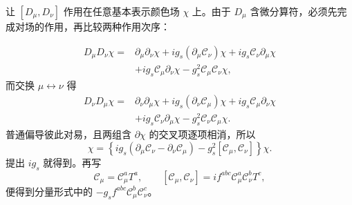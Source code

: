 \begin{derivation}
让 $[D_\mu,D_\nu]$ 作用在任意基本表示颜色场 $\chi$ 上。由于 $D_\mu$ 含微分算符，必须先完成对场的作用，再比较两种作用次序：

\begin{align*}
D_\mu D_\nu\chi
={}&\partial_\mu\partial_\nu\chi
+i g_s(\partial_\mu\mathscr C_\nu)\chi
+i g_s\mathscr C_\nu\partial_\mu\chi\\
&+i g_s\mathscr C_\mu\partial_\nu\chi
-g_s^2\mathscr C_\mu\mathscr C_\nu\chi,
\end{align*}
而交换 $\mu\leftrightarrow\nu$ 得
\begin{align*}
D_\nu D_\mu\chi
={}&\partial_\nu\partial_\mu\chi
+i g_s(\partial_\nu\mathscr C_\mu)\chi
+i g_s\mathscr C_\mu\partial_\nu\chi\\
&+i g_s\mathscr C_\nu\partial_\mu\chi
-g_s^2\mathscr C_\nu\mathscr C_\mu\chi.
\end{align*}
普通偏导彼此对易，且两组含 $\partial\chi$ 的交叉项逐项相消，所以
\begin{equation*}
[D_\mu,D_\nu]\chi
=\left\{i g_s(\partial_\mu\mathscr C_\nu-\partial_\nu\mathscr C_\mu)
-g_s^2[\mathscr C_\mu,\mathscr C_\nu]\right\}\chi.
\end{equation*}
提出 $i g_s$ 就得到。再写
\begin{equation*}
\mathscr C_\mu=\mathscr C_\mu^aT^a,
\qquad
[\mathscr C_\mu,\mathscr C_\nu]
=i f^{abc}\mathscr C_\mu^a\mathscr C_\nu^bT^c,
\end{equation*}
便得到分量形式中的 $-g_sf^{abc}\mathscr C_\mu^b\mathscr C_\nu^c$。
\end{derivation}

